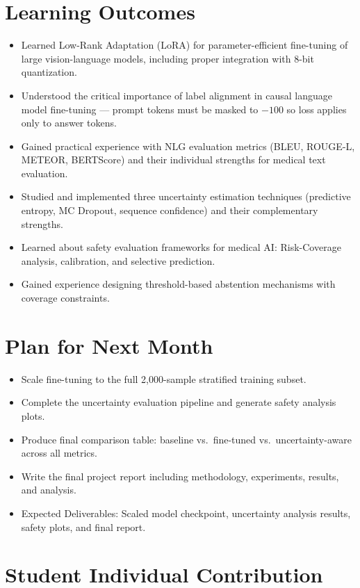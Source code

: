 \documentclass[12pt,a4paper]{article}
\begin{document}
\section{Learning Outcomes}
\begin{itemize}[leftmargin=*]
    \item Learned Low-Rank Adaptation (LoRA) for parameter-efficient fine-tuning of large vision-language models, including proper integration with 8-bit quantization.
    \item Understood the critical importance of label alignment in causal language model fine-tuning --- prompt tokens must be masked to $-100$ so loss applies only to answer tokens.
    \item Gained practical experience with NLG evaluation metrics (BLEU, ROUGE-L, METEOR, BERTScore) and their individual strengths for medical text evaluation.
    \item Studied and implemented three uncertainty estimation techniques (predictive entropy, MC Dropout, sequence confidence) and their complementary strengths.
    \item Learned about safety evaluation frameworks for medical AI: Risk-Coverage analysis, calibration, and selective prediction.
    \item Gained experience designing threshold-based abstention mechanisms with coverage constraints.
\end{itemize}

\section{Plan for Next Month}
\begin{itemize}[leftmargin=*]
    \item Scale fine-tuning to the full 2,000-sample stratified training subset.
    \item Complete the uncertainty evaluation pipeline and generate safety analysis plots.
    \item Produce final comparison table: baseline vs.\ fine-tuned vs.\ uncertainty-aware across all metrics.
    \item Write the final project report including methodology, experiments, results, and analysis.
    \item Expected Deliverables: Scaled model checkpoint, uncertainty analysis results, safety plots, and final report.
\end{itemize}

\section{Student Individual Contribution}
\end{document}
